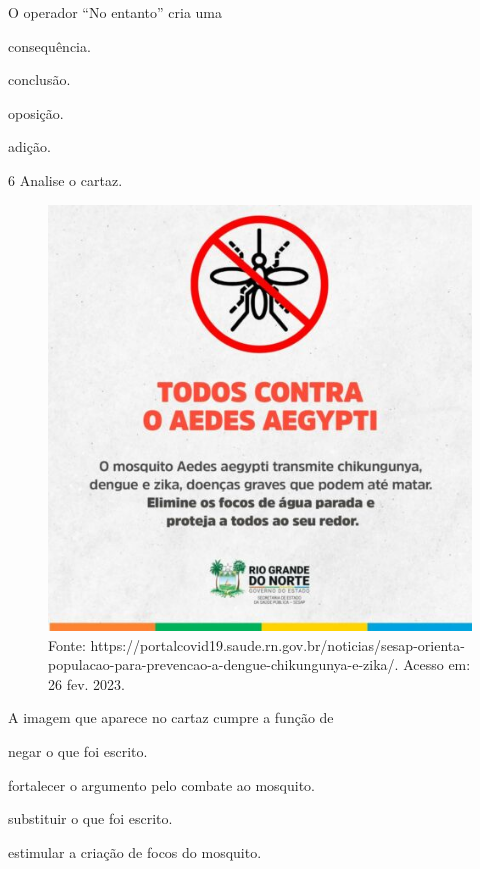 O operador “No entanto” cria uma

\begin{escolha}
\item consequência.

\item conclusão.

\item oposição.

\item adição.
\end{escolha}


\num{6} Analise o cartaz.

\begin{figure}[htpb!]
\includegraphics[width=.5\textwidth]{./imgs/img25.jpg}
\caption{Fonte: https://portalcovid19.saude.rn.gov.br/noticias/sesap-orienta-populacao-para-prevencao-a-dengue-chikungunya-e-zika/. Acesso em: 26 fev. 2023.}
\end{figure}

A imagem que aparece no cartaz cumpre a função de

\begin{escolha}
\item negar o que foi escrito.

\item fortalecer o argumento pelo combate ao mosquito.

\item substituir o que foi escrito.

\item estimular a criação de focos do mosquito.
\end{escolha}

